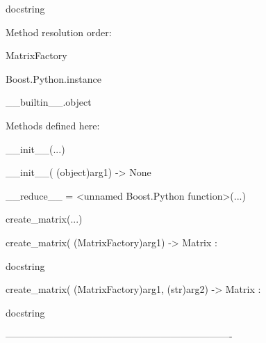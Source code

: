 \documentclass[letterpaper,10pt,english]{sphinxmanual}
\begin{document}
\begin{description}
\begin{description}
\item[{class MatrixFactory(Boost.Python.instance)}] \leavevmode
\begin{DUlineblock}{0em}
\item[] docstring
\item[] 
\item[] Method resolution order:
\item[]
\begin{DUlineblock}{\DUlineblockindent}
\item[] MatrixFactory
\item[] Boost.Python.instance
\item[] \_\_builtin\_\_.object
\item[] 
\end{DUlineblock}
\item[] Methods defined here:
\item[] 
\item[] \_\_init\_\_(...)
\item[]
\begin{DUlineblock}{\DUlineblockindent}
\item[] \_\_init\_\_( (object)arg1) -\textgreater{} None
\item[] 
\end{DUlineblock}
\item[] \_\_reduce\_\_ = \textless{}unnamed Boost.Python function\textgreater{}(...)
\item[] 
\item[] create\_matrix(...)
\item[]
\begin{DUlineblock}{\DUlineblockindent}
\item[] create\_matrix( (MatrixFactory)arg1) -\textgreater{} Matrix :
\item[]
\begin{DUlineblock}{\DUlineblockindent}
\item[] docstring
\item[] 
\end{DUlineblock}
\item[] create\_matrix( (MatrixFactory)arg1, (str)arg2) -\textgreater{} Matrix :
\item[]
\begin{DUlineblock}{\DUlineblockindent}
\item[] docstring
\item[] 
\end{DUlineblock}
\end{DUlineblock}
\item[] ----------------------------------------------------------------------

\end{DUlineblock}
\end{description}
\end{description}
\end{document}
